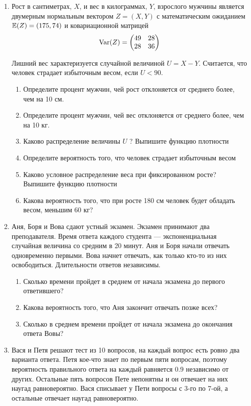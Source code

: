 \documentclass[12pt, a4paper]{article}\usepackage[]{graphicx}\usepackage[]{color}
\begin{document}
\begin{enumerate}
					\item Рост в сантиметрах, $X$, и вес в килограммах, $Y$, взрослого мужчины является двумерным нормальным вектором
					$Z=(X,Y)$ с математическим ожиданием $\mathbb{E}(Z)=(175,74)$ и ковариационной матрицей
					\[
					\operatorname{Var}(Z)=
					\begin{pmatrix}
					49 & 28 \\
					28 & 36
					\end{pmatrix}
					\]


					Лишний вес характеризуется случайной величиной $U=X-Y$. Считается, что человек страдает избыточным весом, если $U<90$.
					\begin{enumerate}
						\item Определите процент мужчин, чей рост отклоняется от среднего более, чем на 10 см.
						\item Определите процент мужчин, чей вес отклоняется от среднего более, чем на 10 кг.
						\item Каково распределение величины $U$ ? Выпишите функцию плотности
						\item Определите вероятность того, что человек страдает избыточным весом
						\item Каково условное распределение веса при фиксированном росте? Выпишите функцию плотности
						\item Какова вероятность того, что при росте 180 см человек будет обладать весом, меньшим 60 кг?
					\end{enumerate}

					\newpage


					\item Аня, Боря и Вова сдают устный экзамен. Экзамен принимают два преподавателя. Время ответа каждого студента — экспоненциальная случайная величина со средним в 20 минут. Аня и Боря начали отвечать одновременно первыми. Вова начнет отвечать, как только кто-то из них освободиться. Длительности ответов независимы.

					\begin{enumerate}
						\item Сколько времени пройдет в среднем от начала экзамена до первого ответившего?
						\item Какова вероятность того, что Аня закончит отвечать позже всех?
						\item Сколько в среднем времени пройдет от начала экзамена до окончания ответа Вовы?
					\end{enumerate}

					\item Вася и Петя решают тест из 10 вопросов, на каждый вопрос есть ровно два варианта ответа. Петя кое-что знает по первым пяти вопросам, поэтому вероятность правильного ответа на каждый равняется 0.9 независимо от других. Остальные пять вопросов Пете непонятны и он отвечает на них наугад равновероятно. Вася списывает у Пети вопросы с 3-го по 7-ой, а остальные отвечает наугад равновероятно.


\end{enumerate}
\end{document}
